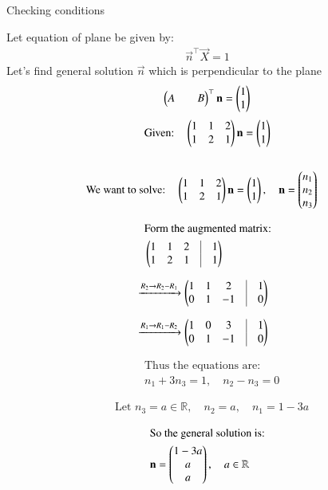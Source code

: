\documentclass{beamer}
\begin{document}
\begin{frame}{Checking conditions}

Let equation of plane be given by:
\begin{align}
    \vec{n}^\top\vec{X}=1
\end{align}
Let's find general solution $\vec{n}$ which is perpendicular to the plane 
\begin{align}
    \begin{pmatrix}A && B\end{pmatrix}^\top\mathbf{n}=\begin{pmatrix}1 \\ 1\end{pmatrix}
\end{align}
\begin{align}
&\text{Given:} \quad
  \begin{pmatrix}1 & 1 & 2\\ 1 & 2 & 1\end{pmatrix}\mathbf{n} = \begin{pmatrix}1 \\ 1\end{pmatrix} \\[1em]
\end{align}
\end{frame}
\begin{frame}
\begin{align}
&\text{We want to solve:} \quad 
\begin{pmatrix}1 & 1 & 2 \\ 1 & 2 & 1\end{pmatrix}\mathbf{n} = \begin{pmatrix}1 \\ 1\end{pmatrix}, 
\quad \mathbf{n} = \begin{pmatrix}n_1 \\ n_2 \\ n_3\end{pmatrix} 
\end{align}

\begin{align}
&\text{Form the augmented matrix:} \\
&\myvec{1 & 1 & 2 & \vline & 1 \\ 1 & 2 & 1 & \vline & 1}
\end{align}

\begin{align}
&\xrightarrow{R_2 \to R_2 - R_1}
\myvec{1 & 1 & 2 & \vline & 1 \\ 0 & 1 & -1 & \vline & 0}
\end{align}

\begin{align}
&\xrightarrow{R_1 \to R_1 - R_2}
\myvec{1 & 0 & 3 & \vline & 1 \\ 0 & 1 & -1 & \vline & 0}
\end{align}
\end{frame}
\begin{frame}
\begin{align}
&\text{Thus the equations are:} \\
&n_1 + 3n_3 = 1, \quad n_2 - n_3 = 0
\end{align}

\begin{align}
&\text{Let } n_3 = a \in \mathbb{R}, \quad
n_2 = a, \quad n_1 = 1 - 3a
\end{align}

\begin{align}
&\text{So the general solution is:} \\
&\mathbf{n} = \begin{pmatrix}1 - 3a \\ a \\ a\end{pmatrix}, \quad a \in \mathbb{R}
\end{align}
\end{frame}
\end{document}
